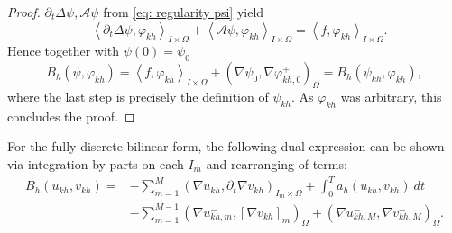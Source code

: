 \documentclass{m2an}
\newcommand{\1}{\mathds{1}}
\newcommand{\Om}{\Omega}
\newcommand{\IOpair}[1]{\left\langle #1 \right\rangle_{I\times \Omega}}
\newcommand{\na}{\nabla}
\newcommand{\Oprod}[1]{\left(#1\right)_{\Omega}}
\theoremstyle{definition}
\newtheorem{remark}[theorem]{Remark}
\newcommand{\Cref}[1]{\zcref{#1}}
\begin{document}
\begin{proof}
    $\partial_t \Delta \psi, \mathcal A\psi$ from \eqref{eq: regularity psi} yield
    \begin{equation*}
        -\IOpair{\partial_t \Delta \psi, \varphi_{kh}} + \IOpair{\mathcal A\psi, \varphi_{kh}}
        = \IOpair{f,\varphi_{kh}}.
    \end{equation*}
    Hence together with $\psi(0) = \psi_0$
    \begin{equation*}
        {B}_h(\psi,\varphi_{kh}) = 
        \IOpair{f, \varphi_{kh} } + \Oprod{\na \psi_0,\na \varphi_{kh,0}^+}
        = {B}_h(\psi_{kh},\varphi_{kh}),
    \end{equation*}
    where the last step is precisely the definition of $\psi_{kh}$. 
    As $\varphi_{kh}$ was arbitrary, this concludes the proof.
\end{proof}

For the fully discrete bilinear form, the following dual expression can be shown via integration by parts on each
$I_m$ and rearranging of terms:
\begin{equation}\label{eq:fully_discrete_bilinear_form_dual}
  \begin{aligned}
    {B}_h(u_{kh},v_{kh}) = & -\sum_{m=1}^M ( \nabla u_{kh}, \partial_t\nabla v_{kh} )_{I_m\times \Omega} 
        + \int_0^T a_h(u_{kh},v_{kh}) \ dt\\
    & - \sum_{m=1}^{M-1} \Oprod{\nabla u^-_{{kh},m},[\na v_{kh}]_{m}} 
        + (\na u_{{kh},M}^-,\na v_{{kh},M}^-)_{\Omega}.
  \end{aligned}
\end{equation}
\end{document}
